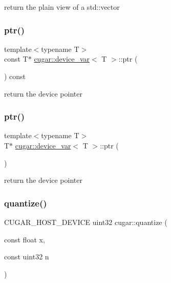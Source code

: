 return the plain view of a std\+::vector \mbox{\label{group___basic_ga7075a2df5b4208648b803def09b239d1}} 
\subsubsection{\texorpdfstring{ptr()}{ptr()}\hspace{0.1cm}{\footnotesize\ttfamily [1/2]}}
{\footnotesize\ttfamily template$<$typename T$>$ \\
const T$\ast$ \hyperlink{structcugar_1_1device__var}{cugar\+::device\+\_\+var}$<$ T $>$\+::ptr (\begin{DoxyParamCaption}{ }\end{DoxyParamCaption}) const\hspace{0.3cm}{\ttfamily [inline]}}

return the device pointer \mbox{\label{group___basic_ga2073bcba54a5c135aa6dae8f0efbf20e}} 
\subsubsection{\texorpdfstring{ptr()}{ptr()}\hspace{0.1cm}{\footnotesize\ttfamily [2/2]}}
{\footnotesize\ttfamily template$<$typename T$>$ \\
T$\ast$ \hyperlink{structcugar_1_1device__var}{cugar\+::device\+\_\+var}$<$ T $>$\+::ptr (\begin{DoxyParamCaption}{ }\end{DoxyParamCaption})\hspace{0.3cm}{\ttfamily [inline]}}

return the device pointer \mbox{\label{group___basic_gaec0861071178aa411d87f2e6e808cfc6}} 
\subsubsection{\texorpdfstring{quantize()}{quantize()}}
{\footnotesize\ttfamily C\+U\+G\+A\+R\+\_\+\+H\+O\+S\+T\+\_\+\+D\+E\+V\+I\+CE uint32 cugar\+::quantize (\begin{DoxyParamCaption}\item[{const float}]{x,  }\item[{const uint32}]{n }\end{DoxyParamCaption})\hspace{0.3cm}{\ttfamily [inline]}}

